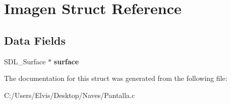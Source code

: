 \hypertarget{struct_imagen}{}\section{Imagen Struct Reference}
\label{struct_imagen}
\subsection*{Data Fields}
\begin{DoxyCompactItemize}
\item 
S\+D\+L\+\_\+\+Surface $\ast$ {\bfseries surface}\hypertarget{struct_imagen_a2f5cac12e913bcfcff660305bf88dd3b}{}\label{struct_imagen_a2f5cac12e913bcfcff660305bf88dd3b}

\end{DoxyCompactItemize}


The documentation for this struct was generated from the following file\+:\begin{DoxyCompactItemize}
\item 
C\+:/\+Users/\+Elvis/\+Desktop/\+Naves/Pantalla.\+c\end{DoxyCompactItemize}
